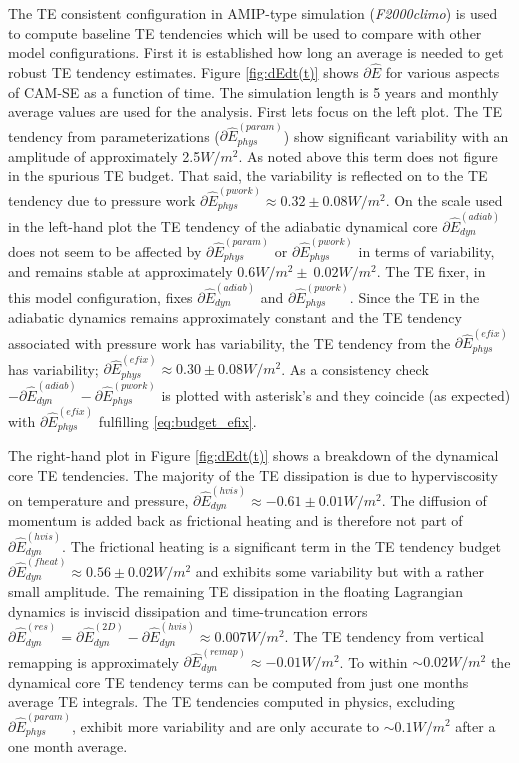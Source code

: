 \documentclass{agujournal}
\newcommand*{\gi}[1]{\widehat{#1}}
\begin{document}
The TE consistent configuration in AMIP-type simulation ({\em{F2000climo}}) is used to compute baseline TE tendencies which will be used to compare with other model configurations. First it is established how long an average is needed to get robust TE tendency estimates. Figure \ref{fig:dEdt(t)} shows $\partial \gi{E}$ for various aspects of CAM-SE as a function of time. The simulation length is 5 years and monthly average values are used for the analysis. First lets focus on the left plot. The TE tendency from parameterizations ($\partial \gi{E}^{(param)}_{phys}$) show significant variability with an amplitude of approximately 2.5$W/m^2$. As noted above this term does not figure in the spurious TE budget. That said, the variability is reflected on to the TE tendency due to pressure work $\partial \gi{E}^{(pwork)}_{phys}\approx 0.32\pm 0.08 W/m^2$. On the scale used in the left-hand plot the TE tendency of the adiabatic dynamical core $\partial \gi{E}^{(adiab)}_{dyn}$ does not seem to be affected by $\partial \gi{E}^{(param)}_{phys}$ or $\partial \gi{E}^{(pwork)}_{phys}$ in terms of variability, and remains stable at approximately 0.6$W/m^2\pm ~0.02 W/m^2$. The TE fixer, in this model configuration, fixes $\partial \gi{E}^{(adiab)}_{dyn}$ and $\partial \gi{E}^{(pwork)}_{phys}$. Since the TE in the adiabatic dynamics remains approximately constant and the TE tendency associated with pressure work has variability, the TE tendency from the $\partial \gi{E}^{(efix)}_{phys}$ has variability; $\partial \gi{E}^{(efix)}_{phys}\approx 0.30 \pm 0.08 W/m^2$. As a consistency check $-\partial \gi{E}^{(adiab)}_{dyn}-\partial \gi{E}^{(pwork)}_{phys}$ is plotted with asterisk's and they coincide (as expected) with $\partial \gi{E}^{(efix)}_{phys}$ fulfilling \eqref{eq:budget_efix}.

The right-hand plot in  Figure \ref{fig:dEdt(t)} shows a breakdown of the dynamical core TE tendencies. The majority of the TE dissipation is due to hyperviscosity on temperature and pressure, $\partial \gi{E}^{(hvis)}_{dyn}\approx -0.61\pm 0.01 W/m^2$. The diffusion of momentum is added back as frictional heating and is therefore not part of $\partial \gi{E}^{(hvis)}_{dyn}$. The frictional heating is a significant term in the TE tendency budget $\partial \gi{E}^{(fheat)}_{dyn}\approx 0.56\pm 0.02 W/m^2$ and exhibits some variability but with a rather small amplitude. The remaining TE dissipation in the floating Lagrangian dynamics is inviscid dissipation and time-truncation errors $\partial \gi{E}_{dyn}^{(res)}=\partial \gi{E}_{dyn}^{({2D})}-\partial \gi{E}_{dyn}^{({hvis})}\approx 0.007 W/m^2$. The TE tendency from vertical remapping is approximately $\partial \gi{E}_{dyn}^{({remap})}\approx -0.01 W/m^2$. To within $\sim 0.02 W/m^2$ the dynamical core TE tendency terms can be computed from just one months average TE integrals. The TE tendencies computed in physics, excluding $\partial \gi{E}^{(param)}_{phys}$, exhibit more variability and are only accurate to $\sim 0.1 W/m^2$ after a one month average.
\end{document}
